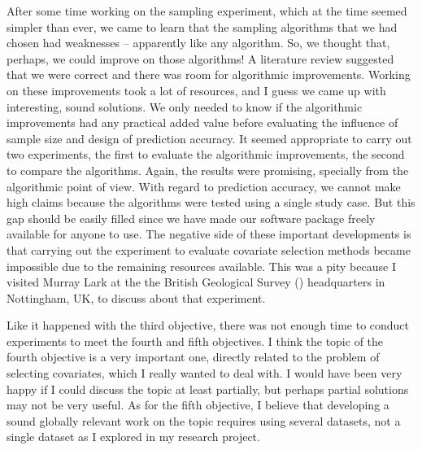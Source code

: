After some time working on the sampling experiment, which at the time seemed simpler than ever, we came to 
learn that the sampling algorithms that we had chosen had weaknesses -- apparently like any algorithm. So, we 
thought that, perhaps, we could improve on those algorithms! A literature review suggested that we were correct 
and there was room for algorithmic improvements. Working on these improvements took a lot of resources, and I 
guess we came up with interesting, sound solutions. We only needed to know if the algorithmic improvements had 
any practical added value before evaluating the influence of sample size and design of prediction accuracy. It 
seemed appropriate to carry out two experiments, the first to evaluate the algorithmic improvements, the second 
to compare the algorithms. Again, the results were promising, specially from the algorithmic point of view. 
With regard to prediction accuracy, we cannot make high claims because the algorithms were tested using a 
single study case. But this gap should be easily filled since we have made our software package freely 
available for anyone to use. The negative side of these important developments is that carrying out the 
experiment to evaluate covariate selection methods became impossible due to the remaining resources available. 
This was a pity because I visited Murray Lark at the the British Geological Survey (\bgs) headquarters in 
Nottingham, UK, to discuss about that experiment.

Like it happened with the third objective, there was not enough time to conduct experiments to meet the 
fourth and fifth objectives. I think the topic of the fourth objective is a very important one, directly 
related to the problem of selecting covariates, which I really wanted to deal with. I would 
have been very happy if I could discuss the topic at least partially, but perhaps partial solutions may not be 
very useful. As for the fifth objective, I believe that developing a sound globally relevant work on the topic 
requires using several datasets, not a single dataset as I explored in my research project.

